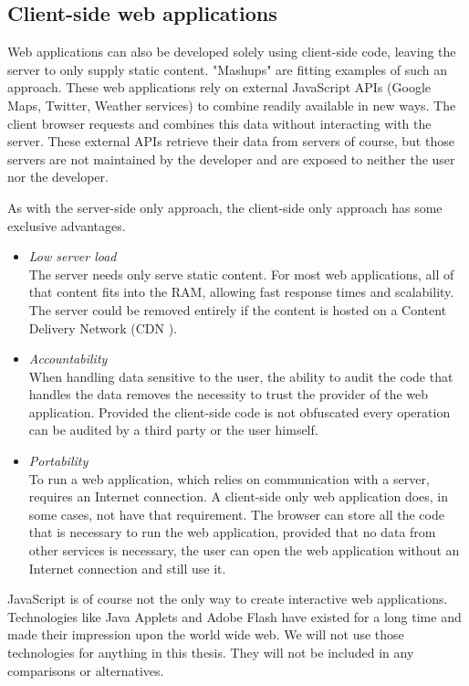 \documentclass[thesis.tex]{subfiles}
\begin{document}
\subsection{Client-side web applications}
Web applications can also be developed solely using client-side code,
leaving the server to only supply static content.
"Mashups"  are fitting examples of such an approach.
These web applications rely on external JavaScript APIs
(Google Maps, Twitter, Weather services) to combine readily available in new
ways. The client browser requests and combines this data without interacting
with the server. These external APIs retrieve their data from servers of course,
but those servers are not maintained by the developer and are exposed to neither
the user nor the developer.

As with the server-side only approach, the client-side only approach has some
exclusive advantages.

\begin{itemize}
	\label{list:client-side-arguments}
	\item \emph{Low server load}\\
	The server needs only serve static content. For most web applications,
	all of that content fits into the RAM, allowing fast response times and
	scalability. The server could be removed entirely if the content is hosted on
	a Content Delivery Network (CDN ).
	\item \emph{Accountability}\\
	When handling data sensitive to the user, the ability to audit the code that
	handles the data removes the necessity to trust the provider of the
	web application. Provided the client-side code is not obfuscated every
	operation can be audited by a third party or the user himself.
	\item \emph{Portability}\\
	To run a web application, which relies on communication with a server,
	requires an Internet connection. A client-side only web application does,
	in some cases, not have that requirement. The browser can store all the code
	that is necessary to run the web application, provided that no data from other
	services is necessary, the user can open the web application without an
	Internet connection and still use it.
\end{itemize}

JavaScript is of course not the only way to create interactive web applications.
Technologies like Java Applets and Adobe Flash have existed for a long time and
made their impression upon the world wide web. We will not use those
technologies for anything in this thesis. They will not be included
in any comparisons or alternatives.
\end{document}
